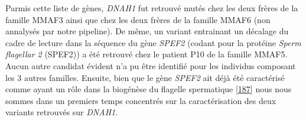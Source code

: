 \documentclass[12pt,twoside]{reedthesis}
\theoremstyle{definition}
\theoremstyle{definition}
\theoremstyle{remark}
\begin{document}
  Parmis cette liste de gènes, \emph{DNAH1} fut retrouvé mutés chez les
  deux frères de la famille MMAF3 ainsi que chez les deux frères de la
  famille MMAF6 (non annalysés par notre pipeline). De même, un variant
  entrainant un décalage du cadre de lecture dans la séquence du gène
  \emph{SPEF2} (codant pour la protéine \emph{Sperm flagellar 2} (SPEF2))
  a été retrouvé chez le patient P10 de la famille MMAF5. Aucun autre
  candidat évident n'a pu être identifié pour les individus composant les
  3 autres familles. Ensuite, bien que le gène \emph{SPEF2} ait déjà été
  caractérisé comme ayant un rôle dans la biogénèse du flagelle
  spermatique {[}\protect\hyperlink{ref-Lehti2017}{187}{]} nous nous
  sommes dans un premiers temps concentrés sur la caractérisation des deux
  variants retrouvés sur \emph{DNAH1}.
  
\end{document}
